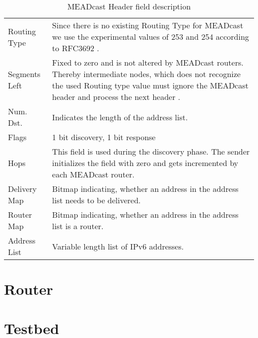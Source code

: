 \bgroup
\begin{table}[h!]
\centering
\def\arraystretch{1.5}%
\setlength{\tabcolsep}{1.2em}
\begin{tabularx}{\textwidth}{lX}
Routing Type  & Since there is no existing Routing Type for MEADcast we use the
                experimental values of 253 and 254 according to RFC3692
                \cite{rfc3692_ipv6_rt_type}.\\
Segments Left & Fixed to zero and is not altered by MEADcast routers. Thereby
                intermediate nodes, which does not recognize the used Routing
                type value must ignore the MEADcast header and process the next
                header \cite{rfc8200_ipv6_hdr}.\\
Num. Dst.     & Indicates the length of the address list. \\
Flags         & 1 bit discovery, 1 bit response        \\
Hops          & This field is used during the discovery phase. The sender
                initializes the field with zero and gets incremented by each
                MEADcast router. \\
Delivery Map  & Bitmap indicating, whether an address in the address list needs
                to be delivered.\\
Router Map    & Bitmap indicating, whether an address in the address list is a
                router.\\
Address List  & Variable length list of IPv6 addresses. \\
\end{tabularx}
\caption{MEADcast Header field description}
\label{tab:my-table}
\end{table}
\egroup

\section{Router} %
\label{sec:Router}



\section{Testbed} %
\label{sec:Testbed_Implementation}



